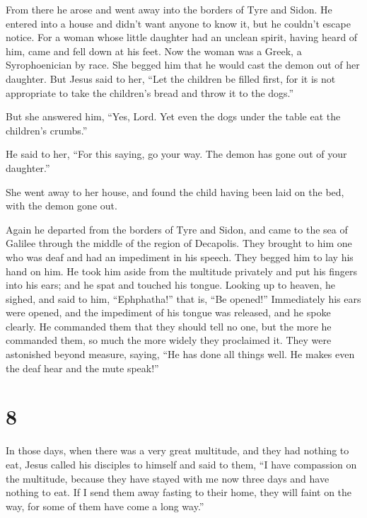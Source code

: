  From there he arose and went away into the borders of
Tyre and Sidon. He entered into a house and didn't want anyone to know
it, but he couldn't escape notice.  For a woman whose
little daughter had an unclean spirit, having heard of him, came and
fell down at his feet.  Now the woman was a Greek, a
Syrophoenician by race. She begged him that he would cast the demon out
of her daughter.  But Jesus said to her, ``Let the
children be filled first, for it is not appropriate to take the
children's bread and throw it to the dogs.''

 But she answered him, ``Yes, Lord. Yet even the dogs
under the table eat the children's crumbs.''

 He said to her, ``For this saying, go your way. The
demon has gone out of your daughter.''

 She went away to her house, and found the child having
been laid on the bed, with the demon gone out.

 Again he departed from the borders of Tyre and Sidon,
and came to the sea of Galilee through the middle of the region of
Decapolis.  They brought to him one who was deaf and had
an impediment in his speech. They begged him to lay his hand on him.
 He took him aside from the multitude privately and put
his fingers into his ears; and he spat and touched his tongue.
 Looking up to heaven, he sighed, and said to him,
``Ephphatha!'' that is, ``Be opened!''  Immediately his
ears were opened, and the impediment of his tongue was released, and he
spoke clearly.  He commanded them that they should tell
no one, but the more he commanded them, so much the more widely they
proclaimed it.  They were astonished beyond measure,
saying, ``He has done all things well. He makes even the deaf hear and
the mute speak!''

\hypertarget{section-7}{%
\section{8}\label{section-7}}

 In those days, when there was a very great multitude, and
they had nothing to eat, Jesus called his disciples to himself and said
to them,  ``I have compassion on the multitude, because
they have stayed with me now three days and have nothing to eat.
 If I send them away fasting to their home, they will
faint on the way, for some of them have come a long way.''

